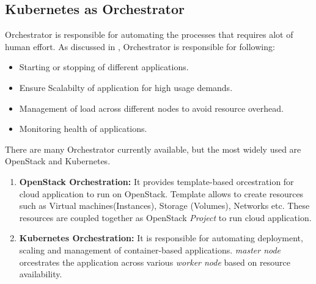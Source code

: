 \subsection{Kubernetes as Orchestrator}
\label{sec:k8s_orchestrator}
Orchestrator is responsible for automating the processes that requires alot of human effort. As discussed in \cite{containerjournal}, Orchestrator is responsible for following:
\begin{itemize}
  \item Starting or stopping of different applications.
  \item Ensure Scalabilty of application for high usage demands.
  \item Management of load across different nodes to avoid resource overhead.
  \item Monitoring health of applications.
\end{itemize}
There are many Orchestrator currently available, but the most widely used are OpenStack and Kubernetes.
\begin{enumerate}
  \item \textbf{OpenStack Orchestration:} It provides template-based orcestration for cloud application to run on OpenStack. Template allows to create resources such as Virtual machines(Instances), Storage (Volumes), Networks etc. These resources are coupled together as OpenStack \emph{Project} to run cloud application\cite{openstackOrchestrator}.
  \item \textbf{Kubernetes Orchestration:} It is responsible for automating deployment, scaling and management of container-based applications. \emph{master node} orcestrates the application across various \emph{worker node} based on resource availability.
\end{enumerate}
